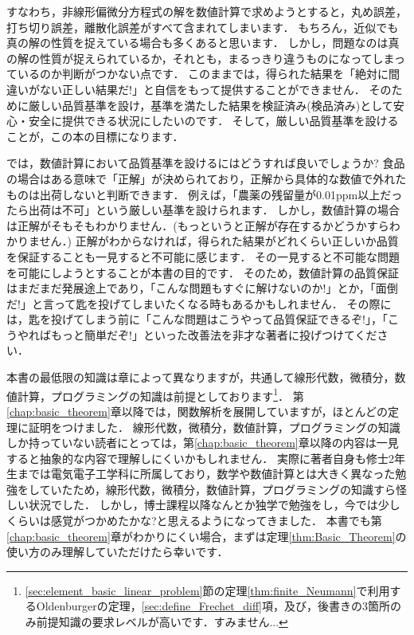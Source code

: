 \documentclass[paper=a5,fontsize=10pt,book]{jlreq}
\begin{document}
すなわち，非線形偏微分方程式の解を数値計算で求めようとすると，丸め誤差，打ち切り誤差，離散化誤差がすべて含まれてしまいます．
もちろん，近似でも真の解の性質を捉えている場合も多くあると思います．
しかし，問題なのは真の解の性質が捉えられているか，それとも，まるっきり違うものになってしまっているのか判断がつかない点です．
このままでは，得られた結果を「絶対に間違いがない正しい結果だ!」と自信をもって提供することができません．
そのために厳しい品質基準を設け，基準を満たした結果を検証済み(検品済み)として安心・安全に提供できる状況にしたいのです．
そして，厳しい品質基準を設けることが，この本の目標になります．


では，数値計算において品質基準を設けるにはどうすれば良いでしょうか?
食品の場合はある意味で「正解」が決められており，正解から具体的な数値で外れたものは出荷しないと判断できます．
例えば，「農薬の残留量が0.01ppm以上だったら出荷は不可」という厳しい基準を設けられます．
しかし，数値計算の場合は正解がそもそもわかりません．(もっというと正解が存在するかどうかすらわかりません．)
正解がわからなければ，得られた結果がどれくらい正しいか品質を保証することも一見すると不可能に感じます．
その一見すると不可能な問題を可能にしようとすることが本書の目的です．
そのため，数値計算の品質保証はまだまだ発展途上であり，「こんな問題もすぐに解けないのか!」とか，「面倒だ!」と言って匙を投げてしまいたくなる時もあるかもしれません．
その際には，匙を投げてしまう前に「こんな問題はこうやって品質保証できるぞ!」，「こうやればもっと簡単だぞ!」といった改善法を非才な著者に投げつけてください．


本書の最低限の知識は章によって異なりますが，共通して線形代数，微積分，数値計算，プログラミングの知識は前提としております\footnote{\ref{sec:element_basic_linear_problem}節の定理\ref{thm:finite_Neumann}で利用するOldenburgerの定理，\ref{sec:define_Frechet_diff}項，及び，後書きの3箇所のみ前提知識の要求レベルが高いです．すみません...}．
第\ref{chap:basic_theorem}章以降では，関数解析を展開していますが，ほとんどの定理に証明をつけました．
線形代数，微積分，数値計算，プログラミングの知識しか持っていない読者にとっては，第\ref{chap:basic_theorem}章以降の内容は一見すると抽象的な内容で理解しにくいかもしれません．
実際に著者自身も修士2年生までは電気電子工学科に所属しており，数学や数値計算とは大きく異なった勉強をしていたため，線形代数，微積分，数値計算，プログラミングの知識すら怪しい状況でした．
しかし，博士課程以降なんとか独学で勉強をし，今では少しくらいは感覚がつかめたかな?と思えるようになってきました．
本書でも第\ref{chap:basic_theorem}章がわかりにくい場合，まずは定理\ref{thm:Basic_Theorem}の使い方のみ理解していただけたら幸いです．
\end{document}
